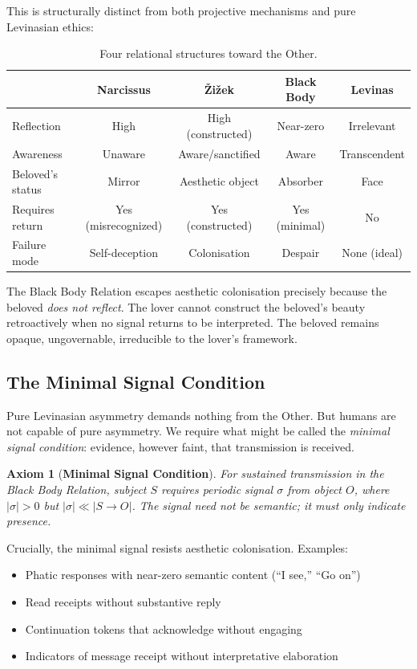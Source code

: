 \documentclass[11pt, a4paper, oneside]{article}
\theoremstyle{analytic}
\newtheorem{axiom}{Axiom}
\begin{document}
This is structurally distinct from both projective mechanisms and pure Levinasian ethics:

\begin{table}[h]
    \centering
    \begin{tabular}{@{}lcccc@{}}
        \toprule
        & \textbf{Narcissus} & \textbf{Žižek} & \textbf{Black Body} & \textbf{Levinas} \\
        \midrule
        Reflection & High & High (constructed) & Near-zero & Irrelevant \\
        Awareness & Unaware & Aware/sanctified & Aware & Transcendent \\
        Beloved's status & Mirror & Aesthetic object & Absorber & Face \\
        Requires return & Yes (misrecognized) & Yes (constructed) & Yes (minimal) & No \\
        Failure mode & Self-deception & Colonisation & Despair & None (ideal) \\
        \bottomrule
    \end{tabular}
    \caption{Four relational structures toward the Other.}
    \label{tab:four-relations}
\end{table}

The Black Body Relation escapes aesthetic colonisation precisely because the beloved \textit{does not reflect}. The lover cannot construct the beloved's beauty retroactively when no signal returns to be interpreted. The beloved remains opaque, ungovernable, irreducible to the lover's framework.

\subsection{The Minimal Signal Condition}

Pure Levinasian asymmetry demands nothing from the Other. But humans are not capable of pure asymmetry. We require what might be called the \textit{minimal signal condition}: evidence, however faint, that transmission is received.

\begin{axiom}[\textbf{Minimal Signal Condition}]
For sustained transmission in the Black Body Relation, subject $S$ requires periodic signal $\sigma$ from object $O$, where $|\sigma| > 0$ but $|\sigma| \ll |S \to O|$. The signal need not be semantic; it must only indicate presence.
\end{axiom}

Crucially, the minimal signal resists aesthetic colonisation. Examples:
\begin{itemize}
    \item Phatic responses with near-zero semantic content (``I see,'' ``Go on'')
    \item Read receipts without substantive reply
    \item Continuation tokens that acknowledge without engaging
    \item Indicators of message receipt without interpretative elaboration
\end{itemize}
\end{document}

